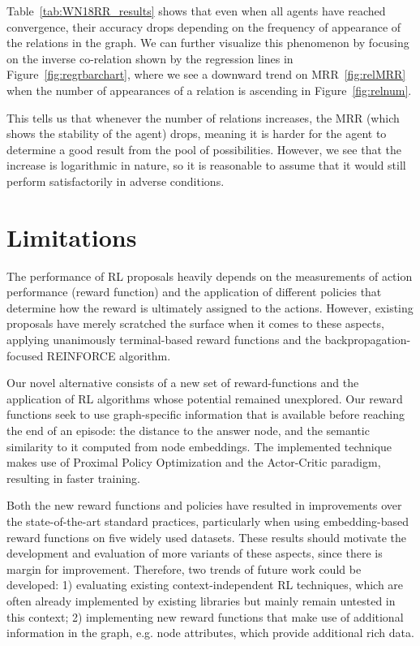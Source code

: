 Table~\ref{tab:WN18RR_results} shows that even when all agents have reached convergence, their accuracy drops depending on the frequency of appearance of the relations in the graph. We can further visualize this phenomenon by focusing on the inverse co-relation shown by the regression lines in Figure~\ref{fig:regrbarchart}, where we see a downward trend on MRR~\ref{fig:relMRR} when the number of appearances of a relation is ascending in Figure~\ref{fig:relnum}.

This tells us that whenever the number of relations increases, the MRR (which shows the stability of the agent) drops, meaning it is harder for the agent to determine a good result from the pool of possibilities. However, we see that the increase is logarithmic in nature, so it is reasonable to assume that it would still perform satisfactorily in adverse conditions.


\section{Limitations}\label{sec:spacerl-limitations}


The performance of RL proposals heavily depends on the measurements of action performance (reward function) and the application of different policies that determine how the reward is ultimately assigned to the actions. However, existing proposals have merely scratched the surface when it comes to these aspects, applying unanimously terminal-based reward functions and the backpropagation-focused REINFORCE algorithm.

Our novel alternative consists of a new set of reward-functions and the application of RL algorithms whose potential remained unexplored. Our reward functions seek to use graph-specific information that is available before reaching the end of an episode: the distance to the answer node, and the semantic similarity to it computed from node embeddings. The implemented technique makes use of Proximal Policy Optimization and the Actor-Critic paradigm, resulting in faster training.

Both the new reward functions and policies have resulted in improvements over the state-of-the-art standard practices, particularly when using embedding-based reward functions on five widely used datasets. These results should motivate the development and evaluation of more variants of these aspects, since there is margin for improvement. Therefore, two trends of future work could be developed: 1) evaluating existing context-independent RL techniques, which are often already implemented by existing libraries but mainly remain untested in this context; 2) implementing new reward functions that make use of additional information in the graph, e.g. node attributes, which provide additional rich data.

